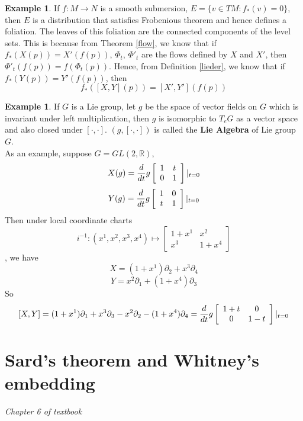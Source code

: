 \documentclass{article}
\theoremstyle{definition}
\newtheorem{exm}[thm]{Example}
\begin{document}
\begin{exm}
If $f: M\rightarrow N$ is a smooth submersion, $E=\{v\in TM: f_*(v)=0\}$, then $E$ is a distribution that satisfies Frobenious theorem and hence defines a foliation. The leaves of this foliation are the connected components of the level sets. This is because from Theorem \ref{flow}, we know that
if $f_*(X(p))=X'(f(p))$, $\Phi_t$, $\Phi'_t$ are the flows defined by $X$
 and $X'$, then $\Phi'_t(f(p))=f(\Phi_t(p))$. Hence, from Definition \ref{lieder}, we know that if $f_*(Y(p))=Y'(f(p))$, then
 \[f_*([X, Y](p))=[X', Y'](f(p))\]
 \end{exm}

\begin{exm}
    If $G$ is a Lie group, let $g$ be the space of vector fields on $G$ which is invariant under left multiplication, then $g$ is isomorphic to $T_eG$ as a vector space and also closed under $[\cdot, \cdot]$. $(g, [\cdot, \cdot])$ is called the {\bf Lie Algebra} of Lie group $G$.\\

    As an example, suppose $G=GL(2, \mathbb{R})$, 
    \[X(g)={d\over dt}g\left[\begin{array}{cc}1 & t\\ 0 & 1\end{array}\right]|_{t=0}\] \[Y(g)={d\over dt}g\left[\begin{array}{cc}1 & 0\\ t & 1\end{array}\right]|_{t=0}\]
    Then under local coordinate charts \[i^{-1}: (x^1, x^2, x^3, x^4)\mapsto \left[\begin{array}{cc}1+x^1 & x^2\\x^3 & 1+x^4\end{array}\right]\], we have
    \[X=(1+x^1)\partial_2+x^3\partial_4\]
    \[Y=x^2\partial_1+(1+x^4)\partial_3\]
    So
    \[[X, Y]=(1+x^1)\partial_1+x^3\partial_3-x^2\partial_2-(1+x^4)\partial_4={d\over dt}g\left[\begin{array}{cc}1+t & 0\\ 0 & 1-t\end{array}\right]|_{t=0}\]
\end{exm}

\newpage

\section{Sard's theorem and Whitney's embedding}

{\em Chapter 6 of textbook}\\
\end{document}
